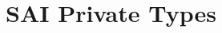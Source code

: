 \hypertarget{group___s_a_i___private___types}{}\section{S\+AI Private Types}
\label{group___s_a_i___private___types}
